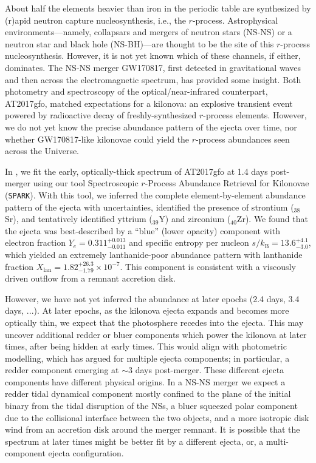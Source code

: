 \documentclass[twocolumn, twocolappendix]{aastex63}
\def\SPARK{\texttt{SPARK}}
\begin{document}
About half the elements heavier than iron in the periodic table are synthesized by (r)apid neutron capture nucleosynthesis, i.e., the $r$-process. Astrophysical environments---namely, collapsars and mergers of neutron stars (NS-NS) or a neutron star and black hole (NS-BH)---are thought to be the site of this $r$-process nucleosynthesis. However, it is not yet known which of these channels, if either, dominates. The NS-NS merger GW170817, first detected in gravitational waves and then across the electromagnetic spectrum, has provided some insight. Both photometry and spectroscopy of the optical/near-infrared counterpart, AT2017gfo, matched expectations for a kilonova: an explosive transient event powered by radioactive decay of freshly-synthesized $r$-process elements. However, we do not yet know the precise abundance pattern of the ejecta over time, nor whether GW170817-like kilonovae could yield the $r$-process abundances seen across the Universe. 

In \cite{vieira23}, we fit the early, optically-thick spectrum of AT2017gfo at 1.4 days post-merger using our tool Spectroscopic $r$-Process Abundance Retrieval for Kilonovae (\SPARK). With this tool, we inferred the complete element-by-element abundance pattern of the ejecta with uncertainties, identified the presence of strontium (${}_{38}$Sr), and tentatively identified yttrium (${}_{39}$Y) and zirconium (${}_{40}$Zr). We found that the ejecta was best-described by a ``blue'' (lower opacity) component with electron fraction $Y_e = 0.311^{+0.013}_{-0.011}$ and specific entropy per nucleon $s / k_{\mathrm{B}} = 13.6^{+4.1}_{-3.0}$, which yielded an extremely lanthanide-poor abundance pattern with lanthanide fraction $X_{\mathrm{lan}} = 1.82^{+26.3}_{-1.79} \times 10^{-7}$. This component is consistent with a viscously driven outflow from a remnant accretion disk. 

However, we have not yet inferred the abundance at later epochs (2.4 days, 3.4 days, ...). At later epochs, as the kilonova ejecta expands and becomes more optically thin, we expect that the photosphere recedes into the ejecta. This may uncover additional redder or bluer components which power the kilonova at later times, after being hidden at early times. This would align with photometric modelling, which has argued for multiple ejecta components; in particular, a redder component emerging at $\sim 3$ days post-merger. These different ejecta components have different physical origins. In a NS-NS merger we expect a redder tidal dynamical component mostly confined to the plane of the initial binary from the tidal disruption of the NSs, a bluer squeezed polar component due to the collisional interface between the two objects, and a more isotropic disk wind from an accretion disk around the merger remnant. It is possible that the spectrum at later times might be better fit by a different ejecta, or, a multi-component ejecta configuration. 
\end{document}
